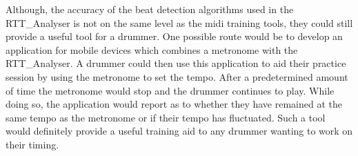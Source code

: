 \documentclass[a4paper, 11pt]{article}
\begin{document}
Although, the accuracy of the beat detection algorithms used in the RTT\_Analyser is not on the same level as the midi training tools, they could still provide a useful tool for a drummer. One possible route would be to develop an application for mobile devices which combines a metronome with the RTT\_Analyser. A drummer could then use this application to aid their practice session by using the metronome to set the tempo. After a predetermined amount of time the metronome would stop and the drummer continues to play. While doing so, the application would report as to whether they have remained at the same tempo as the metronome or if their tempo has fluctuated. Such a tool would definitely provide a useful training aid to any drummer wanting to work on their timing.
\end{document}

